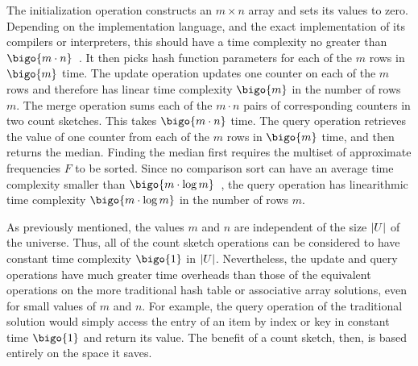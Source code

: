 The initialization operation constructs an \( m \times n \) array and sets its values to zero.
Depending on the implementation language, and the exact implementation of its compilers or interpreters, this should have a time complexity no greater than \( \bigo{m \cdot n} \)~\citep{bentley00}.
It then picks hash function parameters for each of the \( m \) rows in \( \bigo{m} \) time.
The update operation updates one counter on each of the \( m \) rows and therefore has linear time complexity \( \bigo{m} \) in the number of rows \( m \).
The merge operation sums each of the \( m \cdot n \) pairs of corresponding counters in two count sketches.
This takes \( \bigo{m \cdot n} \) time.
The query operation retrieves the value of one counter from each of the \( m \) rows in \( \bigo{m} \) time, and then returns the median.
Finding the median first requires the multiset of approximate frequencies \( F \) to be sorted.
Since no comparison sort can have an average time complexity smaller than \( \bigo{m \cdot \log m} \)~\citep{cormen01}, the query operation has linearithmic time complexity \( \bigo{m \cdot \log m} \) in the number of rows \( m \).

As previously mentioned, the values \( m \) and \( n \) are independent of the size \( \lvert U\rvert \) of the universe.
Thus, all of the count sketch operations can be considered to have constant time complexity \( \bigo{1} \) in \( \lvert U\rvert \).
Nevertheless, the update and query operations have much greater time overheads than those of the equivalent operations on the more traditional hash table or associative array solutions, even for small values of \( m \) and \( n \).
For example, the query operation of the traditional solution would simply access the entry of an item by index or key in constant time \( \bigo{1} \) and return its value.
The benefit of a count sketch, then, is based entirely on the space it saves.
